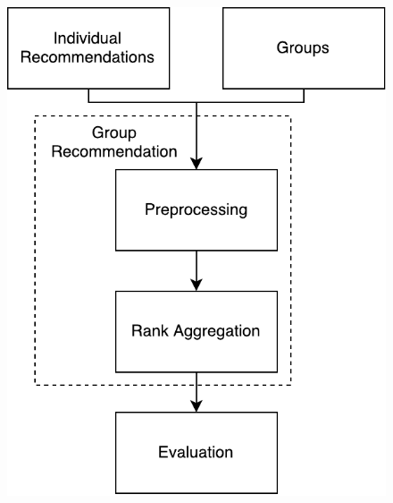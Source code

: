 \begin{frame}
\begin{columns}
\begin{column}{0.45\textwidth}
\begin{figure}
			\includegraphics[scale=.53]{graphics/composition}
		\end{figure}
	\end{column}
\end{columns}
\end{frame}

